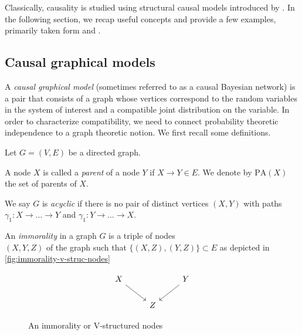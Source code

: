 \documentclass[../main.tex]{subfiles}
\begin{document}
Classically, causality is studied using structural causal models introduced by \cite{pearl2000causality}. In the following section, we recap useful concepts and provide a few examples, primarily taken form \cite{elements_causal_inf} and \cite{Jonas_Peters_mini}. 
\subsection{Causal graphical models}
A \emph{causal graphical model} (sometimes referred to as a causal Bayesian network) is a pair that consists of a graph whose vertices correspond to the random variables in the system of interest and a compatible joint distribution on the variable. In order to characterize compatibility, we need to connect probability theoretic independence to a graph theoretic notion. We first recall some definitions.  
\begin{defn}\label{defn:Immorality}
    Let ${G=(V,E)}$ be a directed graph.

    A node ${X}$ is called a \emph{parent} of a node ${Y}$ if ${X\to Y\in E}$. We denote by ${\text{PA}(X)}$ the set of parents of ${X}$. 

    We say ${G}$ is \emph{acyclic} if there is no pair of distinct vertices ${(X,Y)}$ with paths ${\gamma_1: X\to \dots\to Y}$ and ${\gamma_1: Y\to \dots\to X}$. 

    An \emph{immorality} in a graph ${G}$ is a triple of nodes \\${(X,Y,Z)}$ of the graph such that ${\{(X,Z),(Y,Z)\}\subset E}$ as depicted in \autoref{fig:immorality-v-struc-nodes}
    \begin{figure}
            \[\begin{tikzcd}
            X && Y \\
            & Z
            \arrow[from=1-1, to=2-2]
            \arrow[from=1-3, to=2-2]
        \end{tikzcd}\]
        \caption{An immorality or V-structured nodes}
        \label{fig:immorality-v-struc-nodes}
        \end{figure} 
    \end{defn}
\end{document}
